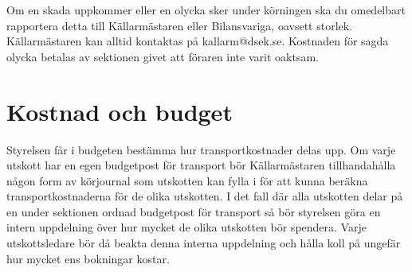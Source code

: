 \documentclass{dsekprotokoll}
\begin{document}
Om en skada uppkommer eller en olycka sker under körningen ska du
omedelbart rapportera detta till Källarmästaren eller Bilansvariga,
oavsett storlek. Källarmästaren kan alltid kontaktas på
kallarm@dsek.se. Kostnaden för sagda olycka betalas av sektionen
givet att föraren inte varit oaktsam.
\section{Kostnad och budget}
Styrelsen får i budgeten bestämma hur transportkostnader delas upp.
Om varje utskott har en egen budgetpost för transport bör
Källarmästaren tillhandahålla någon form av körjournal som utskotten
kan fylla i för att kunna beräkna transportkostnaderna för de olika
utskotten. I det fall där alla utskotten delar på en under sektionen
ordnad budgetpost för transport så bör styrelsen göra en intern
uppdelning över hur mycket de olika utskotten bör spendera. Varje
utskottsledare bör då beakta denna interna uppdelning och hålla koll
på ungefär hur mycket ens bokningar kostar.\newline
\end{document}
